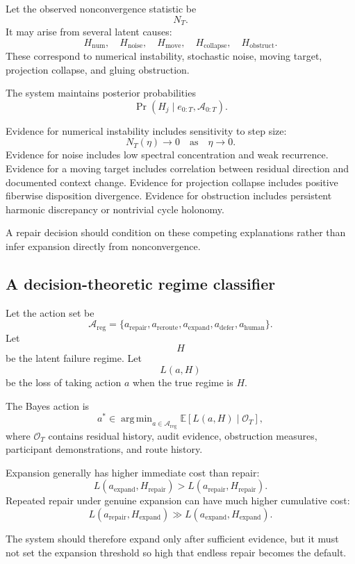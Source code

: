 \documentclass[11pt]{article}
\theoremstyle{definition}
\DeclareMathOperator{\argmin}{arg\,min}
\DeclareMathOperator{\Prob}{Pr}
\newcommand{\E}{\mathbb{E}}
\begin{document}
Let the observed nonconvergence statistic be
\[
N_T.
\]
It may arise from several latent causes:
\[
H_{\mathrm{num}},
\quad
H_{\mathrm{noise}},
\quad
H_{\mathrm{move}},
\quad
H_{\mathrm{collapse}},
\quad
H_{\mathrm{obstruct}}.
\]
These correspond to numerical instability, stochastic noise, moving target, projection collapse, and gluing obstruction.

The system maintains posterior probabilities
\[
\Prob(H_j\mid e_{0:T},\mathcal A_{0:T}).
\]

Evidence for numerical instability includes sensitivity to step size:
\[
N_T(\eta)\to0
\quad
\text{as}\quad
\eta\to0.
\]
Evidence for noise includes low spectral concentration and weak recurrence. Evidence for a moving target includes correlation between residual direction and documented context change. Evidence for projection collapse includes positive fiberwise disposition divergence. Evidence for obstruction includes persistent harmonic discrepancy or nontrivial cycle holonomy.

A repair decision should condition on these competing explanations rather than infer expansion directly from nonconvergence.

\subsection{A decision-theoretic regime classifier}

Let the action set be
\[
\mathcal A_{\mathrm{reg}}
=
\{
a_{\mathrm{repair}},
a_{\mathrm{reroute}},
a_{\mathrm{expand}},
a_{\mathrm{defer}},
a_{\mathrm{human}}
\}.
\]
Let
\[
H
\]
be the latent failure regime. Let
\[
L(a,H)
\]
be the loss of taking action \(a\) when the true regime is \(H\).

The Bayes action is
\[
a^{*}
\in
\argmin_{a\in\mathcal A_{\mathrm{reg}}}
\E[L(a,H)\mid\mathcal O_T],
\]
where \(\mathcal O_T\) contains residual history, audit evidence, obstruction measures, participant demonstrations, and route history.

Expansion generally has higher immediate cost than repair:
\[
L(a_{\mathrm{expand}},H_{\mathrm{repair}})
>
L(a_{\mathrm{repair}},H_{\mathrm{repair}}).
\]
Repeated repair under genuine expansion can have much higher cumulative cost:
\[
L(a_{\mathrm{repair}},H_{\mathrm{expand}})
\gg
L(a_{\mathrm{expand}},H_{\mathrm{expand}}).
\]

The system should therefore expand only after sufficient evidence, but it must not set the expansion threshold so high that endless repair becomes the default.
\end{document}
